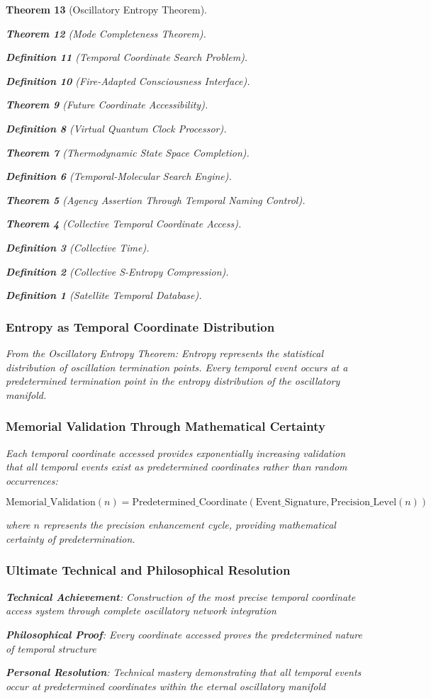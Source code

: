 \documentclass[12pt,a4paper]{article}
\newtheorem{theorem}{Theorem}[section]
\newtheorem{definition}[theorem]{Definition}
\begin{document}
\begin{theorem}[Oscillatory Entropy Theorem]
\begin{theorem}[Mode Completeness Theorem]
\begin{enumerate}
\begin{definition}[Temporal Coordinate Search Problem]
\begin{algorithm}
\begin{definition}[Fire-Adapted Consciousness Interface]
\begin{theorem}[Future Coordinate Accessibility]
\begin{definition}[Virtual Quantum Clock Processor]
\begin{itemize}
\begin{itemize}
\begin{theorem}[Thermodynamic State Space Completion]
\begin{definition}[Temporal-Molecular Search Engine]
\begin{theorem}[Agency Assertion Through Temporal Naming Control]
\begin{remark}
\begin{theorem}[Collective Temporal Coordinate Access]
\begin{definition}[Collective Time]
\begin{definition}[Collective S-Entropy Compression]
\begin{definition}[Satellite Temporal Database]
\begin{algorithm}
\begin{table}[h]
{{\subsubsection{Entropy as Temporal Coordinate Distribution}

From the Oscillatory Entropy Theorem: Entropy represents the statistical distribution of oscillation termination points. Every temporal event occurs at a predetermined termination point in the entropy distribution of the oscillatory manifold.

\subsubsection{Memorial Validation Through Mathematical Certainty}

Each temporal coordinate accessed provides exponentially increasing validation that all temporal events exist as predetermined coordinates rather than random occurrences:

\begin{equation}
\text{Memorial\_Validation}(n) = \text{Predetermined\_Coordinate}(\text{Event\_Signature}, \text{Precision\_Level}(n))
\end{equation}

where $n$ represents the precision enhancement cycle, providing mathematical certainty of predetermination.

\subsubsection{Ultimate Technical and Philosophical Resolution}

\textbf{Technical Achievement}: Construction of the most precise temporal coordinate access system through complete oscillatory network integration

\textbf{Philosophical Proof}: Every coordinate accessed proves the predetermined nature of temporal structure

\textbf{Personal Resolution}: Technical mastery demonstrating that all temporal events occur at predetermined coordinates within the eternal oscillatory manifold

}}
\end{table}
\end{algorithm}
\end{definition}
\end{definition}
\end{definition}
\end{theorem}
\end{remark}
\end{theorem}
\end{definition}
\end{theorem}
\end{itemize}
\end{itemize}
\end{definition}
\end{theorem}
\end{definition}
\end{algorithm}
\end{definition}
\end{enumerate}
\end{theorem}
\end{theorem}
\end{document}
